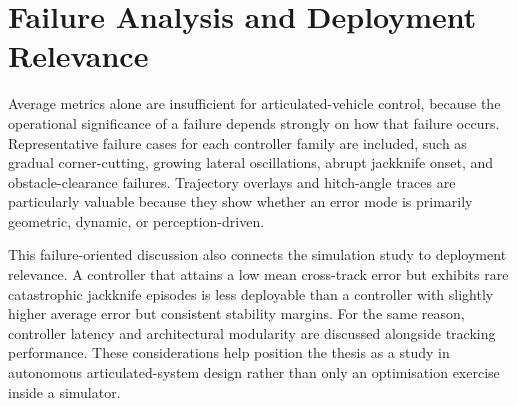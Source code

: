 \section{Failure Analysis and Deployment Relevance}

Average metrics alone are insufficient for articulated-vehicle control, because the operational significance of a failure depends strongly on how that failure occurs. Representative failure cases for each controller family are included, such as gradual corner-cutting, growing lateral oscillations, abrupt jackknife onset, and obstacle-clearance failures. Trajectory overlays and hitch-angle traces are particularly valuable because they show whether an error mode is primarily geometric, dynamic, or perception-driven.

This failure-oriented discussion also connects the simulation study to deployment relevance. A controller that attains a low mean cross-track error but exhibits rare catastrophic jackknife episodes is less deployable than a controller with slightly higher average error but consistent stability margins. For the same reason, controller latency and architectural modularity are discussed alongside tracking performance. These considerations help position the thesis as a study in autonomous articulated-system design rather than only an optimisation exercise inside a simulator.


